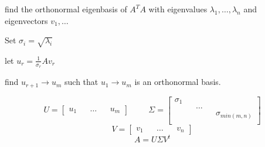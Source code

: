 \documentclass[fleqn]{report}
\newcommand{\hp}{\hspace{1cm}}
\begin{document}
find the orthonormal eigenbasis of $A^T A$ with eigenvalues 
$\lambda_1, \ldots, \lambda_n$ and eigenvectors $v_1, \ldots$

Set $\sigma_i = \sqrt{\lambda_i}$ 

let $u_r = \frac{1}{\sigma_r} A v_r$

find $u_{r+1} \to u_m$ such that $u_1 \to u_m$ is an orthonormal basis. 

\[
U = 
\begin{bmatrix}
    u_1 && \ldots && u_m
\end{bmatrix}
\hp 
\Sigma = 
\begin{bmatrix}
    \sigma_1 && && \\
    && \ldots && \\
    && && \sigma_{min(m, n)} \\
\end{bmatrix}
\]
\[
V = 
\begin{bmatrix}
    v_1 && \ldots && v_n
\end{bmatrix}
\]
\[
A = U \Sigma V^t
\]
\end{document}
